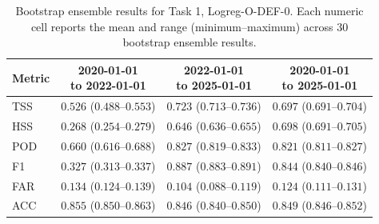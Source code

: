 
\begin{table}[htbp]
\centering
\small
\caption{Bootstrap ensemble results for Task 1, Logreg-O-DEF-0. Each numeric cell reports the mean and range (minimum--maximum) across 30 bootstrap ensemble results.}
\label{tab:app-task1-logreg-o-def-0}
\begin{tabular}{lccc}
\toprule
Metric & \shortstack{2020-01-01\\to 2022-01-01} & \shortstack{2022-01-01\\to 2025-01-01} & \shortstack{2020-01-01\\to 2025-01-01} \\
\midrule
TSS & $0.526$ ($0.488$--$0.553$) & $0.723$ ($0.713$--$0.736$) & $0.697$ ($0.691$--$0.704$) \\
HSS & $0.268$ ($0.254$--$0.279$) & $0.646$ ($0.636$--$0.655$) & $0.698$ ($0.691$--$0.705$) \\
POD & $0.660$ ($0.616$--$0.688$) & $0.827$ ($0.819$--$0.833$) & $0.821$ ($0.811$--$0.827$) \\
F1 & $0.327$ ($0.313$--$0.337$) & $0.887$ ($0.883$--$0.891$) & $0.844$ ($0.840$--$0.846$) \\
FAR & $0.134$ ($0.124$--$0.139$) & $0.104$ ($0.088$--$0.119$) & $0.124$ ($0.111$--$0.131$) \\
ACC & $0.855$ ($0.850$--$0.863$) & $0.846$ ($0.840$--$0.850$) & $0.849$ ($0.846$--$0.852$) \\
\bottomrule
\end{tabular}
\end{table}
\clearpage

